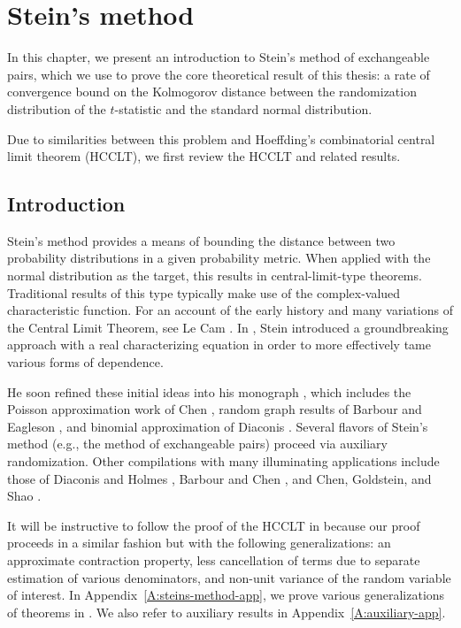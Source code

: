 \chapter{Stein's method}
\label{C:steins-method}
In this chapter, we present an introduction to
Stein's method of exchangeable pairs, which we use to prove the core
theoretical result of this thesis: a rate of convergence bound on the
Kolmogorov distance between the randomization distribution of the $t$-statistic
and the standard normal distribution.

Due to similarities between this problem and Hoeffding's combinatorial central
limit theorem (HCCLT), we first review the HCCLT and related results.

\section{Introduction}
\label{S:steins-method-introduction}
Stein's method provides a means of bounding the distance between two
probability distributions in a given probability metric.  When applied
with the normal distribution as the target, this results in
central-limit-type theorems.  Traditional results of this type
typically make use of the complex-valued characteristic function.  For
an account of the early history and many variations of the Central
Limit Theorem, see Le Cam \cite{cam1986central}.  In
\cite{stein1972bound}, Stein introduced a groundbreaking approach with
a real characterizing equation in order to more effectively tame
various forms of dependence.

He soon refined these initial ideas into his monograph
\cite{stein1986approximate}, which includes the Poisson approximation
work of Chen \cite{chen1975poisson}, random graph results of Barbour
and Eagleson \cite{barbour1985multiple}, and binomial approximation of
Diaconis \cite{diaconis1977distribution}.  Several flavors of Stein's
method (e.g., the method of exchangeable pairs) proceed via auxiliary
randomization.  Other compilations with many illuminating applications
include those of Diaconis and Holmes \cite{diaconis2004stein}, Barbour
and Chen \cite{barbour2005introduction, barbour2005stein}, and
Chen, Goldstein, and Shao \cite{chen2010normal}.

It will be instructive to follow the proof of the HCCLT in \cite{stein1986approximate}
because our proof proceeds in a similar fashion but with the following
generalizations: an approximate contraction property, less
cancellation of terms due to separate estimation of various
denominators, and non-unit variance of the random variable of interest.
In Appendix~\ref{A:steins-method-app}, we prove various
generalizations of theorems in \cite{chen2010normal}.
We also refer to auxiliary results in Appendix~\ref{A:auxiliary-app}.

